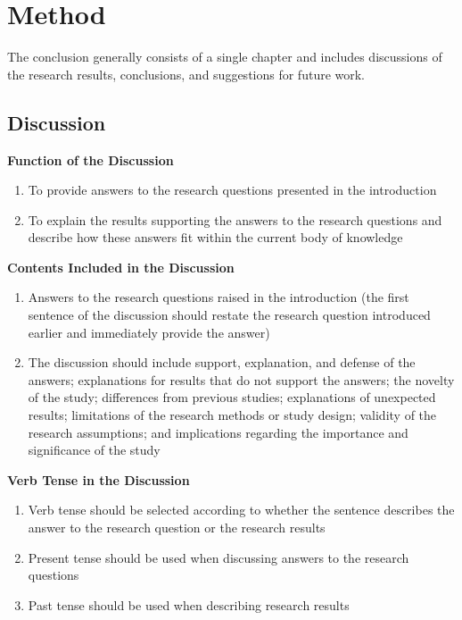 \chapter{Method}

The conclusion generally consists of a single chapter and includes discussions of the research results, conclusions, and suggestions for future work.

\section{Discussion}

\textbf{Function of the Discussion}
\begin{enumerate}
    \item To provide answers to the research questions presented in the introduction
    \item To explain the results supporting the answers to the research questions and describe how these answers fit within the current body of knowledge
\end{enumerate}

\textbf{Contents Included in the Discussion}
\begin{enumerate}
    \item Answers to the research questions raised in the introduction (the first sentence of the discussion should restate the research question introduced earlier and immediately provide the answer)

    \item The discussion should include support, explanation, and defense of the answers; explanations for results that do not support the answers; the novelty of the study; differences from previous studies; explanations of unexpected results; limitations of the research methods or study design; validity of the research assumptions; and implications regarding the importance and significance of the study
\end{enumerate}

\textbf{Verb Tense in the Discussion}
\begin{enumerate}
    \item Verb tense should be selected according to whether the sentence describes the answer to the research question or the research results
    \item Present tense should be used when discussing answers to the research questions
    \item Past tense should be used when describing research results
\end{enumerate}